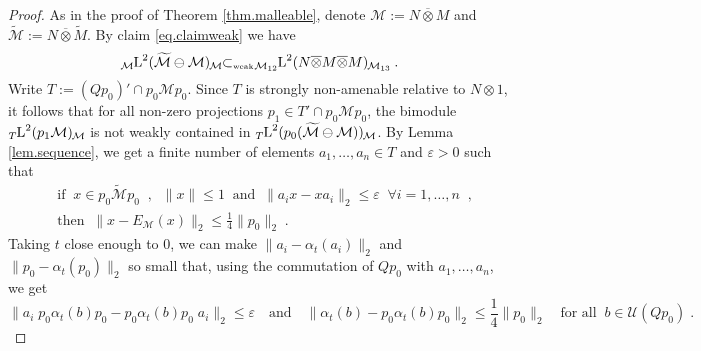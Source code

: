 \documentclass[a4paper,11pt]{amsart}
\numberwithin{equation}{section}
\begin{document}
\begin{proof}
As in the proof of Theorem \ref{thm.malleable}, denote ${\mathcal{M}} := N {\mathbin{\overline{\otimes}}} M$ and ${\widetilde{\mathcal{M}}} := N {\mathbin{\overline{\otimes}}} {\widetilde{M}}$.
By claim \eqref{eq.claimweak} we have
$${\mathord{\raisebox{-0.4ex}[0ex][0ex]{\scriptsize ${\mathcal{M}}$}{{{\mathord{\text{\rm L}}}^2({\widetilde{\mathcal{M}}} \ominus {\mathcal{M}})}}\hspace{-0.2ex}\raisebox{-0.4ex}[0ex][0ex]{\scriptsize ${\mathcal{M}}$}}} {\subset_{\text{\rm\tiny weak}}} {\mathord{\raisebox{-0.4ex}[0ex][0ex]{\scriptsize ${{\mathcal{M}}_{12}}$}{{{\mathord{\text{\rm L}}}^2(N {\mathbin{\overline{\otimes}}} M {\mathbin{\overline{\otimes}}} M)}}\hspace{-0.2ex}\raisebox{-0.4ex}[0ex][0ex]{\scriptsize ${{\mathcal{M}}_{13}}$}}} \; .$$
Write $T := (Qp_0)' \cap p_0 {\mathcal{M}} p_0$. Since $T$ is strongly non-amenable relative to $N {\otimes} 1$, it follows that for all non-zero projections $p_1 \in T' \cap p_0 {\mathcal{M}} p_0$, the bimodule ${\mathord{\raisebox{-0.4ex}[0ex][0ex]{\scriptsize ${T}$}{{{\mathord{\text{\rm L}}}^2(p_1 {\mathcal{M}})}}\hspace{-0.2ex}\raisebox{-0.4ex}[0ex][0ex]{\scriptsize ${\mathcal{M}}$}}}$ is not weakly contained in ${\mathord{\raisebox{-0.4ex}[0ex][0ex]{\scriptsize ${T}$}{{{\mathord{\text{\rm L}}}^2(p_0({\widetilde{\mathcal{M}}} \ominus {\mathcal{M}}))}}\hspace{-0.2ex}\raisebox{-0.4ex}[0ex][0ex]{\scriptsize ${\mathcal{M}}$}}}$. By Lemma \ref{lem.sequence}, we get a finite number of elements $a_1,\ldots,a_n \in T$ and ${\varepsilon} > 0$ such that
\begin{equation}\label{eq.twostar}
\begin{split}
&\text{if}\;\; x \in p_0 {\widetilde{\mathcal{M}}} p_0 \;\; , \;\; \|x\| {\leqslant} 1 \;\;\text{and}\;\; \|a_i x - x a_i \|_2 {\leqslant} {\varepsilon} \;\; \forall i = 1,\ldots,n\;\; , \\ &\text{then}\;\; \|x-E_{\mathcal{M}}(x)\|_2 {\leqslant} \frac{1}{4} \|p_0\|_2 \; .
\end{split}
\end{equation}
Taking $t$ close enough to $0$, we can make $\|a_i - {\alpha}_t(a_i)\|_2$ and $\|p_0 - {\alpha}_t(p_0)\|_2$ so small that, using the commutation of $Qp_0$ with $a_1,\ldots,a_n$, we get
$$\|a_i \; p_0 {\alpha}_t(b) p_0 - p_0 {\alpha}_t(b) p_0 \; a_i \|_2 {\leqslant} {\varepsilon} \quad\text{and}\quad
\|{\alpha}_t(b) - p_0 {\alpha}_t(b) p_0\|_2 {\leqslant} \frac{1}{4}\|p_0\|_2 \quad\text{for all}\;\; b \in {\mathcal{U}}(Qp_0) \; .$$

\end{proof}
\end{document}
